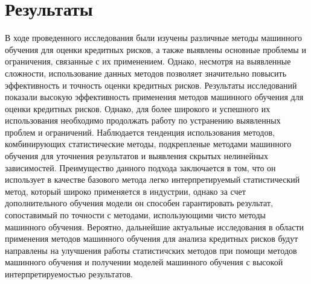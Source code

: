 \documentclass[14pt, letterpaper, twoside]{extarticle}
\begin{document}
\section{Результаты}
В ходе проведенного исследования были изучены различные методы машинного обучения для оценки кредитных рисков, а также выявлены основные проблемы и ограничения, связанные с их применением. Однако, несмотря на выявленные сложности, использование данных методов позволяет значительно повысить эффективность и точность оценки кредитных рисков.
 Результаты исследований показали высокую эффективность применения методов машинного обучения для оценки кредитных рисков. Однако, для более широкого и успешного их использования необходимо продолжать работу по устранению выявленных проблем и ограничений. Наблюдается тенденция использования методов, комбинирующих статистические методы, подкрепленые методами машинного обучения для уточнения результатов и выявления скрытых нелинейных зависимостей. Преимущество данного подхода заключается в том, что он использует в качестве базового метода легко интерпретируемый статистический метод, который широко применяется в индустрии, однако за счет дополнительного обучения модели он способен гарантировать результат, сопоставимый по точности с методами, использующими чисто методы машинного обучения. Вероятно, дальнейшие актуальные исследования в области применения методов машинного обучения для анализа кредитных рисков будут направлены на улучшения работы статистичских методов при помощи методов машинного обучения и получении моделей машинного обучения с высокой интерпретируемостью результатов.


\printbibliography
\end{document}
